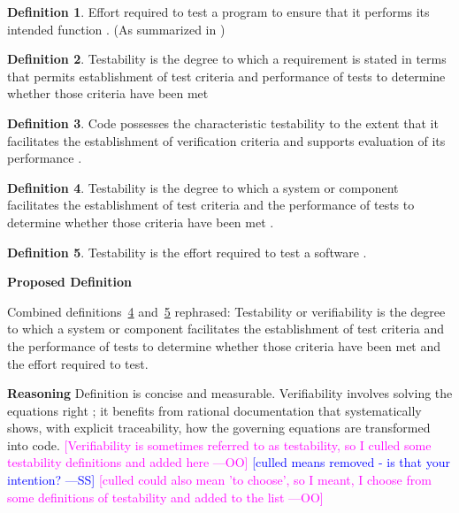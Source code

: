 \documentclass[letterpaper,cleveref]{lipics-v2019}
\newcommand{\authornote}[3]{\textcolor{#1}{[#3 ---#2]}}
\newcommand{\authornote}[3]{}
\newcommand{\wss}[1]{\authornote{blue}{SS}{#1}} %
\newcommand{\oo}[1]{\authornote{magenta}{OO}{#1}} %
\theoremstyle{definition}
\newtheorem{defn}{Definition}
\begin{document}
\begin{defn}
	Effort required to test a program to ensure that it performs its intended
	function \citep{McCallEtAl1977}. (As summarized in \citet{pressman2005software})
\end{defn}

\begin{defn}
    Testability is the degree to which a requirement is stated in terms that permits establishment of test criteria and performance of tests to determine whether those criteria have been met \citep{IEEEStdGlossarySET1990}
\end{defn}
\begin{defn}
	Code possesses the characteristic testability to the extent that it facilitates the establishment of verification criteria and supports evaluation of its performance \citep{boehm1976quantitative}.
\end{defn}

\begin{defn} \label{Defn_Verifiability1}
	Testability is the degree to which a system or component facilitates the establishment of test criteria and the performance of tests to determine whether those criteria have been met \citep{ISO/IEC/IEEE24765}.
\end{defn}

\begin{defn} \label{Defn_Verifiability2}
	Testability is the effort required to test a software \citep{ISO/IEC/IEEE24765}.
\end{defn}

\noindent \textbf{Proposed Definition}

Combined definitions~\ref{Defn_Verifiability1} and~\ref{Defn_Verifiability2} rephrased: Testability or verifiability is the degree to which a system or component facilitates the establishment of test criteria and the performance of tests to determine whether those criteria have been met and the effort required to test.

\noindent \textbf{Reasoning}
Definition is concise and measurable.
Verifiability involves solving the equations right
\citep[p.~23]{Roache1998};
it benefits from rational documentation that systematically shows, with explicit
traceability, how the governing equations are transformed into code.
\oo{Verifiability is sometimes referred to as testability, so I culled some
	testability definitions and added here}  \wss{culled means removed - is that your
	intention?} \oo{culled could also mean  'to choose', so I meant, I choose from some definitions of testability and added to the list}
\end{document}
